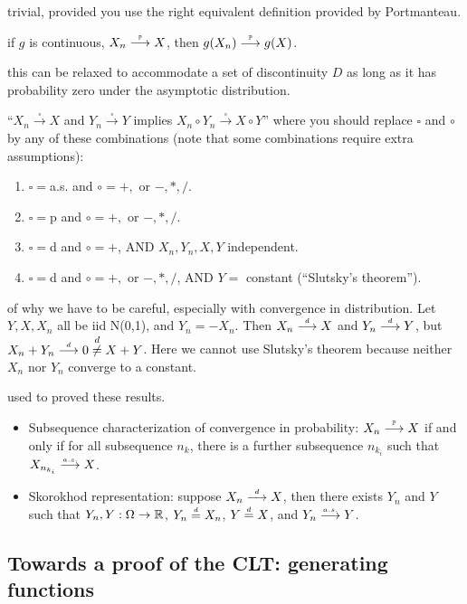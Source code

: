 \documentclass{article}
\begin{document}
 trivial, provided you use the right equivalent definition provided by Portmanteau.

 if $g$ is continuous, $X_n \stackrel{\scriptscriptstyle {\mathbb P}}{\longrightarrow} X$, then $g(X_n) \stackrel{\scriptscriptstyle {\mathbb P}}{\longrightarrow} g(X)$. 

 this can be relaxed to accommodate a set of discontinuity $D$ as long as it has probability zero under the asymptotic distribution.

 ``$X_n \stackrel{\square}{\longrightarrow} X$ and $Y_n \stackrel{\square}{\longrightarrow} Y$ implies $X_n \circ Y_n \stackrel{\square}{\longrightarrow} X \circ Y$'' where you should replace $\square$ and $\circ$ by any of these combinations (note that some combinations require extra assumptions):
\begin{enumerate}
  \item $\square = $a.s. and $\circ = +,$ or $-, *, /$.
  \item $\square = $p and $\circ = +,$ or $-, *, /$.
  \item $\square = $d and $\circ = +$, AND $X_n, Y_n, X, Y$ independent.
  \item $\square = $d and $\circ = +,$ or $-, *, /$, AND $Y = $ constant (``Slutsky's theorem'').
\end{enumerate}

 of why we have to be careful, especially with convergence in distribution. Let $Y, X, X_n$ all be iid N(0,1), and $Y_n = -X_n$. Then $X_n \stackrel{\scriptscriptstyle d}{\longrightarrow} X$ and $Y_n \stackrel{\scriptscriptstyle d}{\longrightarrow} Y$, but $X_n + Y_n \stackrel{\scriptscriptstyle d}{\longrightarrow} 0 \stackrel{d}{\neq} X+Y$. Here we cannot use Slutsky's theorem because neither $X_n$ nor $Y_n$ converge to a constant.

 used to proved these results.
\begin{itemize}
  \item Subsequence characterization of convergence in probability: $X_n \stackrel{\scriptscriptstyle {\mathbb P}}{\longrightarrow} X$ if and only if for all subsequence $n_k$, there is a further subsequence $n_{k_i}$ such that $X_{n_{k_i}} \stackrel{\scriptscriptstyle a.s.}{\longrightarrow} X$.
  \item Skorokhod representation: suppose $X_n \stackrel{\scriptscriptstyle d}{\longrightarrow} X$, then there exists $Y_n$ and $Y$ such that $Y_n, Y: \Omega \to {\mathbb R}$, $Y_n \stackrel{\scriptscriptstyle d}{=} X_n$, $Y \stackrel{\scriptscriptstyle d}{=} X$, and $Y_n \stackrel{\scriptscriptstyle a.s.}{\longrightarrow} Y$.
\end{itemize}


\subsection{Towards a proof of the CLT: generating functions}
\end{document}

